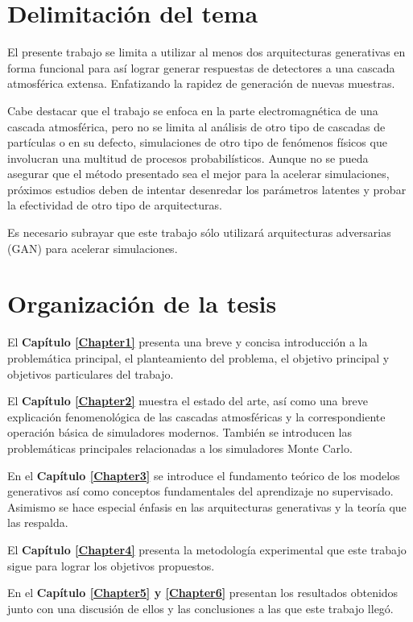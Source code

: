 \section{Delimitación del tema}

El presente trabajo se limita a utilizar al menos dos arquitecturas generativas en forma funcional para así lograr generar respuestas de detectores a una cascada atmosférica extensa. Enfatizando la rapidez de generación de nuevas muestras.

Cabe destacar que el trabajo se enfoca en la parte electromagnética de una cascada atmosférica, pero no se limita al análisis de otro tipo de cascadas de partículas o en su defecto, simulaciones de otro tipo de fenómenos físicos que involucran una multitud de procesos probabilísticos. Aunque no se pueda asegurar que el método presentado sea el mejor para la acelerar simulaciones, próximos estudios deben de intentar desenredar los parámetros latentes y probar la efectividad de otro tipo de arquitecturas. 

Es necesario subrayar que este trabajo sólo utilizará arquitecturas adversarias (GAN) para acelerar simulaciones. 

\section{Organización de la tesis}

El \textbf{Capítulo \ref{Chapter1}} presenta una breve y concisa introducción a la problemática principal, el planteamiento del problema, el objetivo principal y objetivos particulares del trabajo. %

El \textbf{Capítulo \ref{Chapter2}} muestra el estado del arte, así como una breve explicación fenomenológica de las cascadas atmosféricas y la correspondiente operación básica de simuladores modernos. También se introducen las problemáticas principales relacionadas a los simuladores Monte Carlo.

En el \textbf{Capítulo \ref{Chapter3}} se introduce el fundamento teórico de los modelos generativos así como conceptos fundamentales del aprendizaje no supervisado. Asimismo se hace especial énfasis en las arquitecturas generativas y la teoría que las respalda.

El \textbf{Capítulo \ref{Chapter4}} presenta la metodología experimental que este trabajo sigue para lograr los objetivos propuestos. 

En el \textbf{Capítulo \ref{Chapter5} y \ref{Chapter6}} presentan los resultados obtenidos junto con una discusión de ellos y las conclusiones a las que este trabajo llegó. 